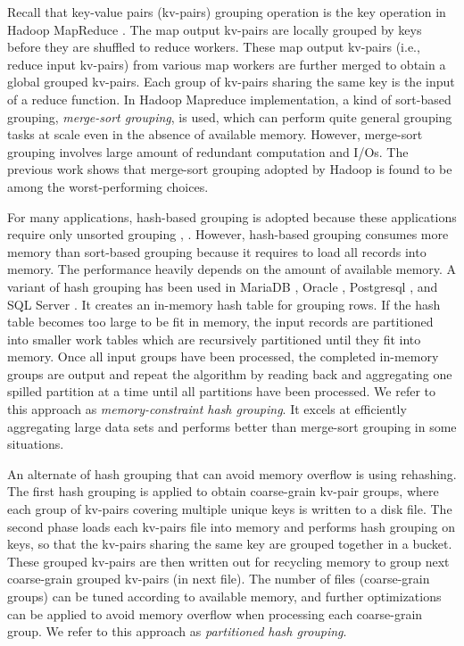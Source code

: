 Recall that key-value pairs (kv-pairs) grouping operation is the key operation in Hadoop MapReduce \cite{dean2008mapreduce}. The map output kv-pairs are locally grouped by keys before they are shuffled to reduce workers. These map output kv-pairs (i.e., reduce input kv-pairs) from various map workers are further merged to obtain a global grouped kv-pairs. Each group of kv-pairs sharing the same key is the input of a reduce function. In Hadoop Mapreduce implementation, a kind of sort-based grouping, \emph{merge-sort grouping}, is used, which can perform quite general grouping tasks at scale even in the absence of available memory. However, merge-sort grouping involves large amount of redundant computation and I/Os. The previous work \cite{shvachko2010hadoop,yu2009distributed,Li2011A} shows that merge-sort grouping adopted by Hadoop is found to be among the worst-performing choices.

For many applications, hash-based grouping is adopted because these applications require only unsorted grouping \cite{lin2011tenzing}, \cite{yu2009distributed}. However, hash-based grouping consumes more memory than sort-based grouping because it requires to load all records into memory. The performance heavily depends on the amount of available memory. A variant of hash grouping has been used in MariaDB \cite{bartholomew2012mariadb}, Oracle \cite{stephens2005oracle}, Postgresql \cite{momjian2001postgresql}, and SQL Server \cite{agrawal2005database}. It creates an in-memory hash table for grouping rows. If the hash table becomes too large to be fit in memory, the input records are partitioned into smaller work tables which are recursively partitioned until they fit into memory. Once all input groups have been processed, the completed in-memory groups are output and repeat the algorithm by reading back and aggregating one spilled partition at a time until all partitions have been processed. We refer to this approach as \emph{memory-constraint hash grouping}. It excels at efficiently aggregating large data sets and performs better than merge-sort grouping in some situations.

An alternate of hash grouping that can avoid memory overflow is using rehashing. The first hash grouping is applied to obtain coarse-grain kv-pair groups, where each group of kv-pairs covering multiple unique keys is written to a disk file. The second phase loads each kv-pairs file into memory and performs hash grouping on keys, so that the kv-pairs sharing the same key are grouped together in a bucket. These grouped kv-pairs are then written out for recycling memory to group next coarse-grain grouped kv-pairs (in next file). The number of files (coarse-grain groups) can be tuned according to available memory, and further optimizations can be applied to avoid memory overflow when processing each coarse-grain group. We refer to this approach as \emph{partitioned hash grouping}.

